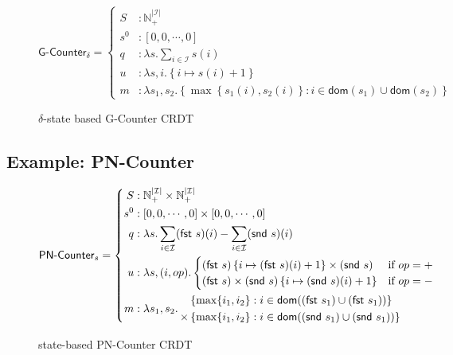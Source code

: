 \begin{figure}[H]
  \centering
  \[
    \textsf{G-Counter}_\delta = \left\{\begin{aligned}
      S &: \mathbb{N}_+^{|\mathcal{I}|} \\
      s^0 &: \left[ 0, 0, \cdots, 0 \right] \\
      q &: \lambda s. \sum_{i \in \mathcal{I}} s(i) \\
      u &: \lambda s,i. \left\{ i \mapsto s(i) + 1 \right\} \\
      m &: \lambda s_1, s_2. \left\{ \max\left\{ s_1(i), s_2(i) \right\}: i \in \mathsf{dom}(s_1) \cup
      \mathsf{dom}(s_2) \right\}
    \end{aligned}\right.
  \]
  \caption{$\delta$-state based \textsf{G-Counter} CRDT}
\end{figure}

\subsection{Example: PN-Counter}
\label{sec:example-pncounter}

\begin{figure}[H]
  \[
    \textsf{PN-Counter}_s = \left\{\begin{aligned}
      S &: \mathbb{N}_+^{|\mathcal{I}|} \times \mathbb{N}_+^{|\mathcal{I}|} \\
      s^0 &: \left[ 0, 0, \cdots, 0 \right] \times \left[ 0, 0, \cdots, 0 \right] \\
      q &: \lambda s. \sum_{i \in \mathcal{I}} (\textsf{fst}~s)(i) - \sum_{i \in
        \mathcal{I}} (\textsf{snd}~s)(i) \\
      u &: \lambda s,(i,op). \begin{cases}
             (\textsf{fst}~s)\left\{ i \mapsto (\textsf{fst}~s)(i) + 1 \right\} \times (\textsf{snd}~s) & \text{if $op=+$} \\
             (\textsf{fst}~s) \times (\textsf{snd}~s)\left\{ i \mapsto (\textsf{snd}~s)(i) + 1 \right\} & \text{if $op=-$} \\
           \end{cases} \\
      m &: \lambda s_1, s_2.\, \begin{aligned}
             &\left\{ \max\{ i_1, i_2 \} : i \in \mathsf{dom}((\textsf{fst}~s_1) \cup (\textsf{fst}~s_1)) \right\} \\
             \times &\left\{ \max\{ i_1, i_2 \} : i \in \mathsf{dom}((\textsf{snd}~s_1) \cup (\textsf{snd}~s_1)) \right\}
           \end{aligned}
    \end{aligned}\right.
  \]
  \caption{state-based \textsf{PN-Counter} CRDT}
\end{figure}

